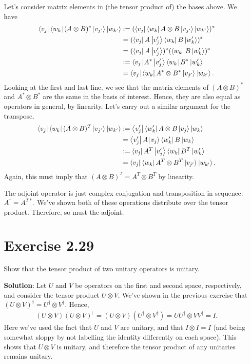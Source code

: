 \documentclass{book}
\begin{document}
    Let's consider matrix elements in (the tensor product of) the bases above. We have
    \begin{align}
    \begin{aligned}
        \bra{v_j}\bra{w_k} (A\otimes B)^* \ket{v_{j'}}\ket{w_{k'}} &:= (\bra{v_j}\bra{w_k} A\otimes B \ket{v_{j'}}\ket{w_{k'}})^* \\
        &= (\bra{v_j}A\ket{v_j'} \bra{w_k}B\ket{w_k'})^* \\
        &= (\bra{v_j}A\ket{v_j'})^* (\bra{w_k}B\ket{w_k'})^* \\
        &:=\bra{v_j}A^*\ket{v_j'}\bra{w_k}B^*\ket{w_k'}\\
        &= \bra{v_j}\bra{w_k} A^*\otimes B^* \ket{v_{j'}}\ket{w_{k'}}.
    \end{aligned}
    \end{align}
    Looking at the first and last line, we see that the matrix elements of $(A\otimes B)^*$ and $A^* \otimes B^*$ are the same in the basis of interest. Hence, they are also equal as operators in general, by linearity. Let's carry out a similar argument for the transpose.
    \begin{align}
    \begin{aligned}
        \bra{v_j}\bra{w_k} (A\otimes B)^T \ket{v_{j'}}\ket{w_{k'}} &:= \bra{v_j'}\bra{w_k'} A\otimes B \ket{v_{j}}\ket{w_{k}} \\
        &= \bra{v_j'}A\ket{v_j} \bra{w_k'}B\ket{w_k} \\
        &:=\bra{v_j}A^T\ket{v_j'}\bra{w_k}B^T\ket{w_k'}\\
        &= \bra{v_j}\bra{w_k} A^T\otimes B^T \ket{v_{j'}}\ket{w_{k'}}.
    \end{aligned}
    \end{align}
    Again, this must imply that $(A\otimes B)^T = A^T \otimes B^T$ by linearity.
    
    The adjoint operator is just complex conjugation and transposition in sequence: $A^\dagger = A^{T*}$. We've shown both of these operations distribute over the tensor product. Therefore, so must the adjoint.
    
\section*{Exercise 2.29}
    Show that the tensor product of two unitary operators is unitary.
    
    \textbf{Solution}: Let $U$ and $V$ be operators on the first and second space, respectively, and consider the tensor product $U\otimes V$. We've shown in the previous exercise that $(U \otimes V)^\dagger = U^\dagger \otimes V^\dagger$. Hence,
    \begin{align}
        (U\otimes V)(U \otimes V)^\dagger = (U\otimes V)(U^\dagger \otimes V^\dagger) = U U^\dagger \otimes V V^\dagger = I. 
    \end{align}
    Here we've used the fact that $U$ and $V$ are unitary, and that $I\otimes I = I$ (and being somewhat sloppy by not labelling the identity differently on each space). This shows that $U\otimes V$ is unitary, and therefore the tensor product of any unitaries remains unitary.
\end{document}
